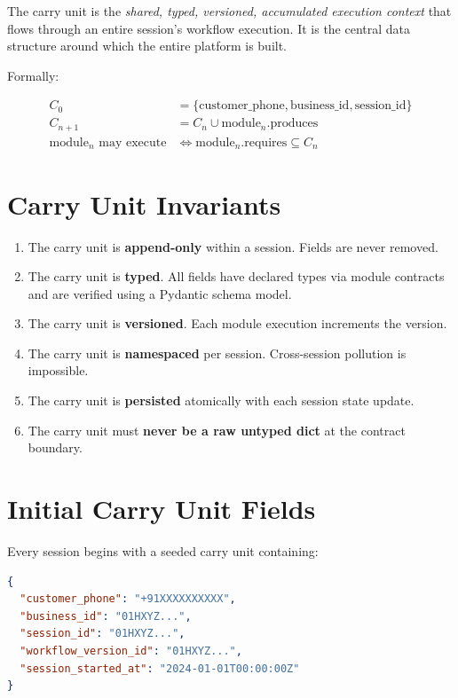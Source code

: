 \documentclass[12pt, a4paper]{report}
\newenvironment{invariantbox}[1]{%
  \begin{tcolorbox}[
    colback=red!4!white,
    colframe=warningred,
    title={\textbf{INVARIANT: #1}},
    fonttitle=\small\bfseries
  ]
}{%
  \end{tcolorbox}
}
\begin{document}
The carry unit is the \textit{shared, typed, versioned, accumulated execution context} that flows through an entire session's workflow execution. It is the central data structure around which the entire platform is built.

Formally:

\begin{align}
  C_0 &= \{ \text{customer\_phone}, \text{business\_id}, \text{session\_id} \} \\
  C_{n+1} &= C_n \cup \text{module}_n.\text{produces} \\
  \text{module}_n \text{ may execute} &\iff \text{module}_n.\text{requires} \subseteq C_n
\end{align}

\section{Carry Unit Invariants}

\begin{invariantbox}{Carry Unit Invariants}
\begin{enumerate}
  \item The carry unit is \textbf{append-only} within a session. Fields are never removed.
  \item The carry unit is \textbf{typed}. All fields have declared types via module contracts and are verified using a Pydantic schema model.
  \item The carry unit is \textbf{versioned}. Each module execution increments the version.
  \item The carry unit is \textbf{namespaced} per session. Cross-session pollution is impossible.
  \item The carry unit is \textbf{persisted} atomically with each session state update.
  \item The carry unit must \textbf{never be a raw untyped dict} at the contract boundary.
\end{enumerate}
\end{invariantbox}

\section{Initial Carry Unit Fields}

Every session begins with a seeded carry unit containing:

\begin{lstlisting}[language=json, caption={Initial Carry Unit}]
{
  "customer_phone": "+91XXXXXXXXXX",
  "business_id": "01HXYZ...",
  "session_id": "01HXYZ...",
  "workflow_version_id": "01HXYZ...",
  "session_started_at": "2024-01-01T00:00:00Z"
}
\end{lstlisting}
\end{document}
